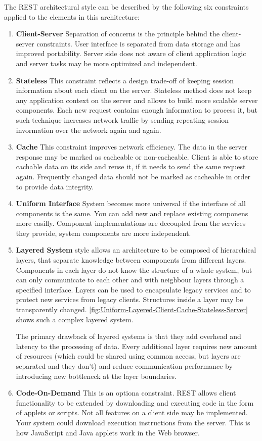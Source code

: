 The REST architectural style can be described by the following six constraints
applied to the elements in this architecture\cite{Fielding2000}:
\begin{enumerate}
  \item \textbf{Client-Server}
  Separation of concerns is the principle behind the client-server constraints.
  User interface is separated from data storage and has improved portability.
  Server side does not aware of client application logic and server tasks may be
  more optimized and independent.
  \item \textbf{Stateless}
  This constraint reflects a design trade-off of keeping session
  information about each client on the server. Stateless method does not keep
  any application context on the server and allows to build more scalable server
  components. Each new request contains enough information to process it, but
  such technique increases network traffic by sending repeating session
  invormation over the network again and again.
  \item \textbf{Cache}
  This constraint improves network efficiency. The data in the server response
  may be marked as cacheable or non-cacheable. Client is able to store cachable
  data on its side and reuse it, if it needs to send the same request again.
  Frequently changed data should not be marked as cacheable in order to provide
  data integrity.
  \item \textbf{Uniform Interface}
  System becomes more universal if the interface of all components is the same.
  You can add new and replace existing componens more easilly. Component
  implementations are decoupled from the services they provide, system
  components are more independent. 
  \item \textbf{Layered System} style allows an architecture to be composed of hierarchical
  layers, that separate knowledge between components from different layers.
  Components in each layer do not know the structure of a whole system, but can
  only communicate to each other and with neighbour layers through a specified
  interface. Layers can be used to encapsulate legacy services and to protect
  new services from legacy clients. Structures inside a layer may be
  transparently changed.
  \autoref{fig:Uniform-Layered-Client-Cache-Stateless-Server} shows such a
  complex layered system.
  
  The primary drawback of layered systems is that they add overhead and latency
  to the processing of data. Every additional layer requires new amount of
  resources (which could be shared using common access, but layers are
  separated and they don't) and reduce communication performance by introducing
  new bottleneck at the layer boundaries.
  \item \textbf{Code-On-Demand}
  This is an optiona constraint. REST allows client functionality to be extended
  by downloading and executing code in the form of applets or scripts. Not all
  features on a client side may be implemented. Your system could download
  execution instructions from the server. This is how JavaScript and Java
  applets work in the Web browser.
 
\end{enumerate}




